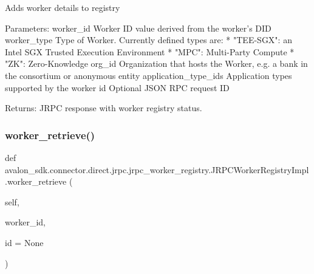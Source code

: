 \begin{DoxyVerb}Adds worker details to registry

Parameters:
worker_id            Worker ID value derived from the worker's DID
worker_type          Type of Worker. Currently defined types are:
             * "TEE-SGX": an Intel SGX Trusted Execution
               Environment
             * "MPC": Multi-Party Compute
             * "ZK": Zero-Knowledge
org_id               Organization that hosts the Worker,
             e.g. a bank in the consortium or
             anonymous entity
application_type_ids Application types supported by the worker
id                   Optional JSON RPC request ID

Returns:
JRPC response with worker registry status.
\end{DoxyVerb}
 \mbox{\label{classavalon__sdk_1_1connector_1_1direct_1_1jrpc_1_1jrpc__worker__registry_1_1JRPCWorkerRegistryImpl_a0d4da599b7d82da348588c43f6ca7a38}} 
\subsubsection{\texorpdfstring{worker\+\_\+retrieve()}{worker\_retrieve()}}
{\footnotesize\ttfamily def avalon\+\_\+sdk.\+connector.\+direct.\+jrpc.\+jrpc\+\_\+worker\+\_\+registry.\+J\+R\+P\+C\+Worker\+Registry\+Impl.\+worker\+\_\+retrieve (\begin{DoxyParamCaption}\item[{}]{self,  }\item[{}]{worker\+\_\+id,  }\item[{}]{id = {\ttfamily None} }\end{DoxyParamCaption})}

